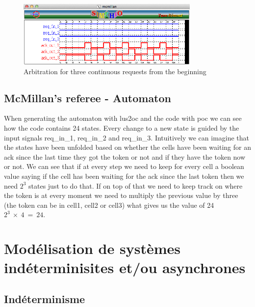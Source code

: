 \documentclass{article}
\begin{document}
\begin{itemize}
\begin{figure}[!ht]
\begin{center}
\includegraphics[width=0.8\textwidth, natwidth=610,natheight=642] {img/three-continuosly-from-beginning.png}
\end{center}
\label{three-continuosly-from-beginning}
\caption{Arbitration for three continuous requests from the beginning}
\end{figure}

\end{itemize}

\subsection{McMillan's referee - Automaton}

When generating the automaton with lus2oc and the code with poc we can see how
the code contains 24 states. Every change to a new state is guided by the input
signals req\_in\_1, req\_in\_2 and req\_in\_3. Intuitively we can imagine that
the states have been unfolded based on whether the cells have been waiting for
an ack since the last time they got the token or not and if they have the token
now or not. We can see that if at every step we need to keep for every cell
a boolean value saying if the cell has been waiting for the ack since the last
token then we need $2^{3}$ states just to do that. If on top of that we need
to keep track on where the token is at every moment we need to multiply the 
previous value by three (the token can be in cell1, cell2 or cell3) what
gives us the value of 24 $2^{3}~\times~4~=~24$.

\section{Modélisation de systèmes indéterminisites et/ou asynchrones}

\subsection{Indéterminisme}
\end{document}
